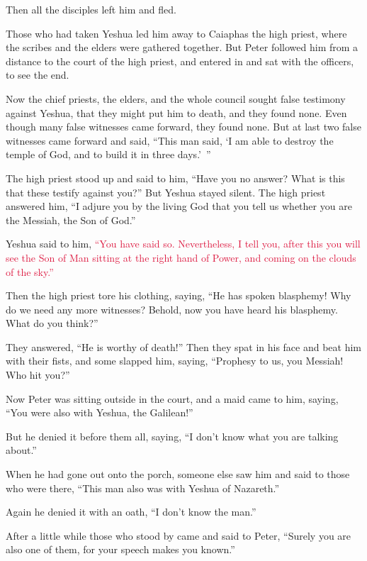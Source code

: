 Then all the disciples left him and fled.

\myverse{}Those who had taken Yeshua led him away to Caiaphas the high
priest, where the scribes and the elders were gathered together.
\myverse{}But Peter followed him from a distance to the court of the high priest, and
entered in and sat with the officers, to see the end.

\myverse{}Now the chief priests, the elders, and the whole council sought
false testimony against Yeshua, that they might put him to death,
\myverse{}and they found none. Even though many false witnesses came forward, they
found none. But at last two false witnesses came forward
\myverse{}and said, “This man said, ‘I am able to destroy the temple of God, and to
build it in three days.’ ”

\myverse{}The high priest stood up and said to him, “Have you no answer?
What is this that these testify against you?”
\myverse{}But Yeshua stayed silent. The high priest answered him, “I adjure you by
the living God that you tell us whether you are the Messiah, the Son of God.”

\myverse{}Yeshua said to him,
\textcolor{crimson}{“You have said so. Nevertheless, I tell you, after this you will see the Son of Man sitting at the
	right hand of Power, and coming on the clouds of the sky.”}

\myverse{}Then the high priest tore his clothing, saying, “He has spoken
blasphemy! Why do we need any more witnesses? Behold, now you have heard his blasphemy.
\myverse{}What do you think?”

They answered, “He is worthy of death!”
\myverse{}Then they spat in his face and beat him with their fists, and some slapped
him,
\myverse{}saying, “Prophesy to us, you Messiah! Who hit you?”

\myverse{}Now Peter was sitting outside in the court, and a maid came
to him, saying, “You were also with Yeshua, the Galilean!”

\myverse{}But he denied it before them all, saying, “I don’t know what
you are talking about.”

\myverse{}When he had gone out onto the porch, someone else saw him and
said to those who were there, “This man also was with Yeshua of Nazareth.”

\myverse{}Again he denied it with an oath, “I don’t know the man.”

\myverse{}After a little while those who stood by came and said to Peter,
“Surely you are also one of them, for your speech makes you known.”

